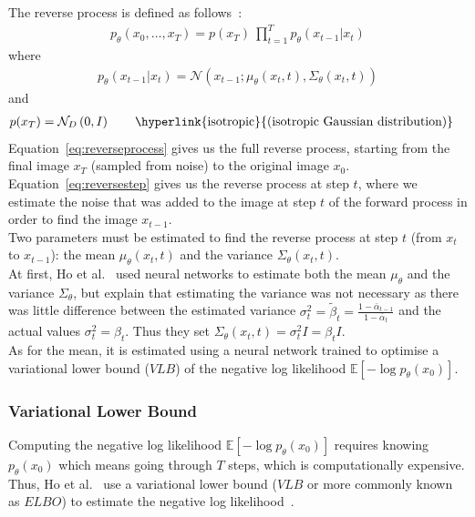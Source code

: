 \documentclass[twoside]{article}
\numberwithin{equation}{section}
\numberwithin{figure}{section}
\begin{document}
The reverse process is defined as follows~\cite{ho2020denoising}:
\begin{align}
  p_{\theta}\left(x_0, \dots, x_T\right) = p\left(x_T\right) \: \prod_{t=1}^T p_{\theta}\left(x_{t-1} | x_t\right) \label{eq:reverseprocess}
\end{align}
where
\begin{align}
  p_{\theta}\left(x_{t-1} | x_t\right) = \mathcal{N}\left(x_{t-1}; \mu_{\theta}\left(x_t, t\right), \Sigma_{\theta}\left(x_t, t\right)\right) \label{eq:reversestep}
\end{align}
and
\begin{align}
  p(x_T) &= \mathcal{N}_D\left(0, I\right) \qquad \text{\hyperlink{isotropic}{(isotropic Gaussian distribution)}} \notag
\end{align}
Equation~\ref{eq:reverseprocess} gives us the full reverse process, starting from the final image $x_T$ (sampled from noise) to the original image $x_0$. \\
Equation~\ref{eq:reversestep} gives us the reverse process at step $t$, where we estimate the noise that was added to the image at step $t$ of the forward process in order to find the image $x_{t-1}$. \\
Two parameters must be estimated to find the reverse process at step $t$ (from $x_t$ to $x_{t-1}$): the mean $\mu_{\theta}\left(x_t, t\right)$ and the variance $\Sigma_{\theta}\left(x_t, t\right)$. \\
At first, Ho et al.~\cite{ho2020denoising} used neural networks to estimate both the mean $\mu_\theta$ and the variance $\Sigma_\theta$, but explain that estimating the variance was not necessary as there was little difference between the estimated variance $\sigma_t^2 = \tilde{\beta}_t = \frac{1 - \bar{\alpha}_{t-1}}{1 - \bar{\alpha}_t}$ and the actual values $\sigma_t^2 = \beta_t$. Thus they set $\Sigma_{\theta}\left(x_t, t\right) = \sigma_t^2 I = \beta_t I$. \\
As for the mean, it is estimated using a neural network trained to optimise a variational lower bound ($VLB$) of the negative log likelihood $\mathbb{E}\left[- \log p_{\theta} \left(x_0\right)\right]$.

\subsubsection{Variational Lower Bound}
Computing the negative log likelihood $\mathbb{E}\left[- \log p_{\theta} \left(x_0\right)\right]$ requires knowing $p_{\theta} (x_0)$ which means going through $T$ steps, which is computationally expensive. \\
Thus, Ho et al.~\cite{ho2020denoising} use a variational lower bound ($VLB$ or more commonly known as $ELBO$) to estimate the negative log likelihood~\cite{sohldickstein2015deep}.
\end{document}
